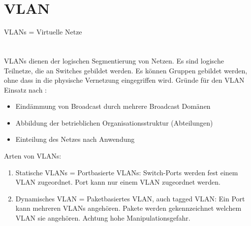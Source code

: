 \section*{VLAN}

VLANs = Virtuelle Netze \\
\cite[S.167-169]{zisler2018computer} \\
\cite{bsiLogSeg}\\

VLANs dienen der logischen Segmentierung von Netzen. Es sind logische Teilnetze, die an Switches gebildet werden. Es können Gruppen gebildet werden, ohne dass in die physische Vernetzung eingegriffen wird.
Gründe für den VLAN Einsatz nach \cite[S.167]{zisler2018computer}:
\begin{itemize}
  \item Eindämmung von Broadcast durch mehrere Broadcast Domänen
  \item Abbildung der betrieblichen Organisationsstruktur (Abteilungen)
  \item Einteilung des Netzes nach Anwendung 
\end{itemize}



Arten von VLANs: 
\begin{enumerate}
  \item Statische VLANs = Portbasierte VLANs: Switch-Ports werden fest einem VLAN zugeordnet. Port kann nur einem VLAN zugeordnet werden. 
  \item Dynamisches VLAN = Paketbasiertes VLAN, auch tagged VLAN: Ein Port kann mehreren VLANs angehören. Pakete werden gekennzeichnet welchem VLAN sie angehören. Achtung hohe Manipulationsgefahr. 
\end{enumerate}

